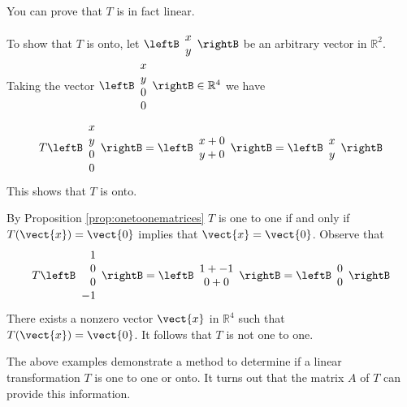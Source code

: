 \begin{solution} 
You can prove that $T$ is in fact linear. 

To show that $T$ is onto, let $\leftB \begin{array}{c} 
x \\
y
\end{array} \rightB$ be an arbitrary vector in $\mathbb{R}^2$. Taking the vector $\leftB \begin{array}{c}
x \\
y \\
0 \\
0 
\end{array} \rightB \in \mathbb{R}^4$ we have 
\[
T \leftB \begin{array}{c}
x \\
y \\
0 \\
0
\end{array}
\rightB = 
\leftB \begin{array}{c}
x + 0 \\
y + 0 
\end{array}
\rightB
= \leftB \begin{array}{c}
x \\
y 
\end{array}
\rightB
\]
This shows that $T$ is onto. 

By Proposition \ref{prop:onetoonematrices} $T$ is one to one if and only if $T(\vect{x}) = \vect{0}$ implies that $\vect{x} = \vect{0}$. Observe that 
\[
T \leftB \begin{array}{r}
1 \\
0 \\
0 \\
-1
\end{array}
\rightB = 
\leftB \begin{array}{c}
1 + -1 \\
0 + 0 
\end{array}
\rightB
= \leftB \begin{array}{c}
0 \\
0 
\end{array}
\rightB
\]
There exists a nonzero vector $\vect{x}$ in $\mathbb{R}^4$ such that $T(\vect{x}) = \vect{0}$. It follows that $T$ is not one to one.
\end{solution}

The above examples demonstrate a method to determine if a linear transformation $T$ is one to one or onto. It turns out that the matrix $A$ of $T$ can provide this information.

